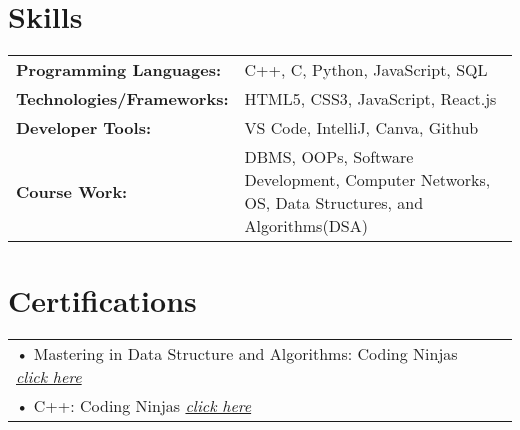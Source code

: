 \documentclass[a4paper,12pt]{article}
\begin{document}
\section{Skills}
\begin{tabularx}{\linewidth}{@{}l X@{}}
\textbf{Programming Languages:} &  \normalsize{C++, C, Python, JavaScript, SQL}\\
\textbf{Technologies/Frameworks:} &  \normalsize{HTML5, CSS3, JavaScript, React.js}\\
\textbf{Developer Tools:} &  \normalsize{VS Code, IntelliJ, Canva, Github}\\
\textbf{Course Work:} &  \normalsize{DBMS, OOPs, Software Development, Computer Networks, OS, Data
 Structures, and Algorithms(DSA)}\\
  \end{tabularx}
\section{Certifications}
\begin{tabularx}{\linewidth}{@{}l X@{}}
 • Mastering in Data Structure and Algorithms: Coding Ninjas \href{https://certificate.codingninjas.com/view/2c56b45f31894da8}{\textit{click here}} \\
• C++: Coding Ninjas \href{https://certificate.codingninjas.com/view/cdab417996cf4e80}{\textit{click here}} \\
 \end{tabularx}
  

\vfill
{}
\end{document}

